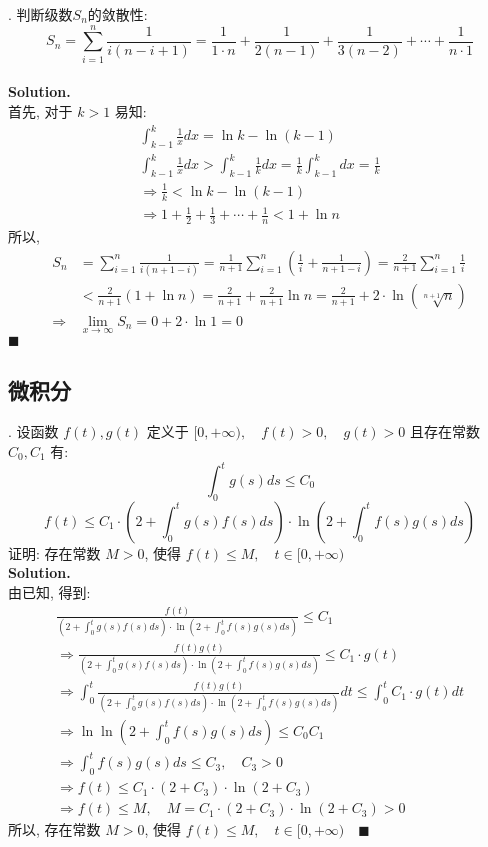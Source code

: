 \documentclass[UTF8]{article}
\begin{document}
. 判断级数$S_n$的敛散性: $$S_n = \sum_{i=1}^{n}\frac{1}{i(n-i+1)} = \frac{1}{1\cdot n} + \frac{1}{2(n-1)} + \frac{1}{3(n-2)}+ \cdots + \frac{1}{n \cdot 1}$$ \\
\noindent \textbf{Solution.} \\
首先, 对于 $k>1$ 易知: 
\begin{align*}
\int_{k-1}^{k}\frac{1}{x}dx = \ln k - \ln(k-1) \\
\int_{k-1}^{k}\frac{1}{x}dx > \int_{k-1}^{k}\frac{1}{k}dx = \frac{1}{k}\int_{k-1}^{k}dx = \frac{1}{k} \\
\Longrightarrow \frac{1}{k} < \ln k - \ln (k-1) \\
\Longrightarrow 1+\frac{1}{2} + \frac{1}{3} + \cdots + \frac{1}{n} < 1+ \ln n
\end{align*}
所以, 
\begin{align*}
S_n & = \sum_{i=1}^{n}\frac{1}{i(n+1-i)} = \frac{1}{n+1}\sum_{i=1}^{n}\left(\frac{1}{i}+\frac{1}{n+1-i}\right) = \frac{2}{n+1} \sum_{i=1}^{n}  \frac{1}{i} \\
& < \frac{2}{n+1}(1+\ln n) = \frac{2}{n+1} + \frac{2}{n+1} \ln n = \frac{2}{n+1} + 2 \cdot \ln \left(\sqrt[n+1]{n}\right) \\
\Longrightarrow & \lim_{x \to \infty}S_n = 0 + 2\cdot \ln 1 = 0 
\end{align*}
$\blacksquare$

\subsection{微积分}
. 设函数 $f(t), g(t) $ 定义于 $[0,+\infty), \quad f(t)>0, \quad g(t) >0$ 且存在常数 $C_0,C_1$ 有:  $$\int_{0}^{t}g(s)ds \leq C_0$$  $$f(t) \leq C_1 \cdot \left(2+\int_{0}^{t}g(s)f(s)ds\right) \cdot \ln(2+\int_{0}^{t}f(s)g(s)ds)$$ 
证明: 存在常数 $M>0$, 使得 $f(t) \leq M, \quad t\in [0,+\infty)$ \\
\noindent \textbf{Solution.} \\
由已知, 得到:
\begin{align*}
 \frac{f(t)}{(2+\int_{0}^{t}g(s)f(s)ds ) \cdot \ln(2+\int_{0}^{t}f(s)g(s)ds)} \leq C_1 \\
\Longrightarrow  \frac{f(t)g(t)}{(2+\int_{0}^{t}g(s)f(s)ds ) \cdot \ln(2+\int_{0}^{t}f(s)g(s)ds)} \leq C_1\cdot g(t) \\
\Longrightarrow \int_{0}^{t} \frac{f(t)g(t)}{(2+\int_{0}^{t}g(s)f(s)ds ) \cdot \ln(2+\int_{0}^{t}f(s)g(s)ds)} dt \leq \int_{0}^{t}C_1\cdot g(t) dt \\
\Longrightarrow \ln \ln (2+\int_{0}^{t}f(s)g(s)ds) \leq C_0C_1 \\
\Longrightarrow \int_{0}^{t}f(s)g(s)ds \leq C_3 , \quad C_3 > 0\\
\Longrightarrow f(t) \leq C_1\cdot (2+C_3) \cdot \ln(2+C_3) \\
\Longrightarrow f(t) \leq M, \quad M = C_1\cdot (2+C_3) \cdot \ln(2+C_3) > 0  
\end{align*}
所以, 存在常数 $M>0$, 使得 $f(t) \leq M, \quad t\in [0,+\infty) \quad \blacksquare$
\end{document}
